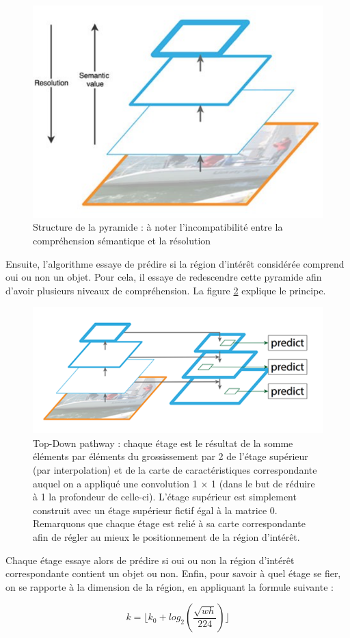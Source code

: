 \begin{figure}[!h]
\centering
\includegraphics[width=200pts]{images/Mask_R_CNN/FPN_1.png} 
\caption{Structure de la pyramide : à noter l'incompatibilité entre la compréhension sémantique et la résolution}
\label{FPN_1}
\end{figure}

Ensuite, l'algorithme essaye de prédire si la région d'intérêt considérée comprend oui ou non un objet. Pour cela, il essaye de redescendre cette pyramide afin d'avoir plusieurs niveaux de compréhension. La figure \ref{FPN_2} explique le principe.

\begin{figure}[!h]
\centering
\includegraphics[width=200pts]{images/Mask_R_CNN/FPN_2.png} 
\caption{Top-Down pathway : chaque étage est le résultat de la somme éléments par éléments du grossissement par 2 de l'étage supérieur (par interpolation) et de la carte de caractéristiques correspondante auquel on a appliqué une convolution 1 $\times$ 1 (dans le but de réduire à 1 la profondeur de celle-ci). L'étage supérieur est simplement construit avec un étage supérieur fictif égal à la matrice 0. Remarquons que chaque étage est relié à sa carte correspondante afin de régler au mieux le positionnement de la région d'intérêt.}
\label{FPN_2}
\end{figure}

Chaque étage essaye alors de prédire si oui ou non la région d'intérêt correspondante contient un objet ou non. Enfin, pour savoir à quel étage se fier, on se rapporte à la dimension de la région, en appliquant la formule suivante :

$$k = \lfloor k_0 + log_2( \frac{ \sqrt{wh}}{224} ) \rfloor $$

